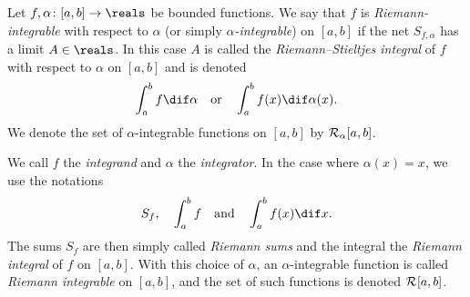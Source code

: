 \documentclass[article, a4paper, 11pt, oneside]{memoir}
\numberwithin{equation}{chapter}
\begin{document}
\begin{definition}
    Let $f,\alpha \colon [a,b] \to \reals$ be bounded functions. We say that $f$ is \emph{Riemann-integrable} with respect to $\alpha$ (or simply \emph{$\alpha$-integrable}) on $[a,b]$ if the net $S_{f,\alpha}$ has a limit $A \in \reals$. In this case $A$ is called the \emph{Riemann--Stieltjes integral} of $f$ with respect to $\alpha$ on $[a,b]$ and is denoted
    \begin{equation*}
        \int_a^b f \dif \alpha
        \quad \text{or} \quad
        \int_a^b f(x) \dif \alpha(x).
    \end{equation*}
    We denote the set of $\alpha$-integrable functions on $[a,b]$ by $\integrable[\alpha]{a,b}$.
\end{definition}
%
We call $f$ the \emph{integrand} and $\alpha$ the \emph{integrator}. In the case where $\alpha(x) = x$, we use the notations
%
\begin{equation*}
    S_f,
    \quad
    \int_a^b f
    \quad \text{and} \quad
    \int_a^b f(x) \dif x.
\end{equation*}
%
The sums $S_f$ are then simply called \emph{Riemann sums} and the integral the \emph{Riemann integral} of $f$ on $[a,b]$. With this choice of $\alpha$, an $\alpha$-integrable function is called \emph{Riemann integrable} on $[a,b]$, and the set of such functions is denoted $\integrable{a,b}$.
\end{document}
